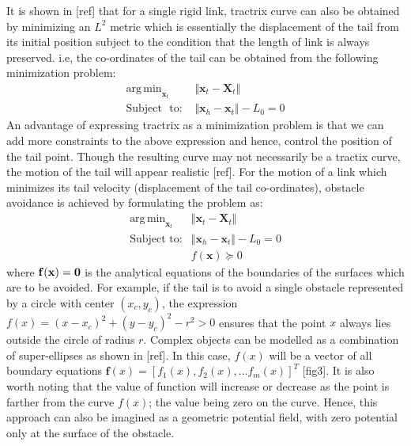\documentclass[12pt,a4]{article}
\DeclareMathOperator*{\argmin}{arg\,min}
\begin{document}
It is shown in [ref] that for a single rigid link, tractrix curve can also be obtained by minimizing an $L^2$ metric which is essentially the displacement of the tail from its initial position subject to the condition that the length of link is always preserved. i.e, the co-ordinates of the tail can be obtained from the following minimization problem:
\begin{align} \label{eq:Opt_prob_main}
\argmin_{\textbf{x}_t} &\Vert \textbf{x}_t-\textbf{X}_t \Vert\\
\text{Subject~ to:  } &\Vert \textbf{x}_h - \textbf{x}_t \Vert -L_0 = 0 \nonumber
\end{align}
An advantage of expressing tractrix as a minimization problem is that we can add more constraints to the above expression and hence, control the position of the tail point. Though the resulting curve may not necessarily be a tractix curve, the motion of the tail will appear realistic [ref]. For the motion of a link which minimizes its tail velocity (displacement of the tail co-ordinates), obstacle avoidance is achieved by formulating the problem as:
\begin{align} \label{eq:obstacle_avoidance_opt}
\argmin_{\textbf{x}_t} &\Vert \textbf{x}_t-\textbf{X}_t \Vert\\
\text{Subject to:} 
&\Vert \textbf{x}_h - \textbf{x}_t \Vert -L_0 = 0 \nonumber \\ 
~~ &f(\textbf{x}) \succeq 0  \nonumber
\end{align}
where $\bf{f}(x) = 0$ is the analytical equations of the boundaries of the surfaces which are to be avoided. For example, if the tail is to avoid a single obstacle represented by a circle with center $(x_c,y_c)$, the expression $f(x) = (x-x_c)^2+(y-y_c)^2-r^2>0$ ensures that the point $x$ always lies outside the circle of radius $r$. Complex objects can be modelled as a combination of super-ellipses as shown in [ref]. In this case, $f(x)$ will be a vector of all boundary equations $\textbf{f}(x) = [f_1(x),f_2(x),...f_m(x)]^T$ [fig3]. It is also worth noting that the value of function will increase or decrease as the point is farther from the curve $f(x)$; the value being zero on the curve. Hence, this approach can also be imagined as a geometric potential field, with zero potential only at the surface of the obstacle. 
\end{document}
